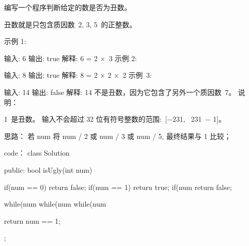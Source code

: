 编写一个程序判断给定的数是否为丑数。

丑数就是只包含质因数 2, 3, 5 的正整数。

示例 1:

输入: 6
输出: true
解释: 6 = 2 × 3
示例 2:

输入: 8
输出: true
解释: 8 = 2 × 2 × 2
示例 3:

输入: 14
输出: false 
解释: 14 不是丑数，因为它包含了另外一个质因数 7。
说明：

1 是丑数。
输入不会超过 32 位有符号整数的范围: [−231,  231 − 1]。




















思路：
若 num %
将 num / 2 或 num / 3 或  num / 5, 最终结果与 1 比较；
























code：
class Solution {
public:
    bool isUgly(int num) {
        if(num == 0) return false;
        if(num == 1) return true;
        if(num %
            return false;
        
        while(num %
        while(num %
        while(num %
        
        return num == 1;
    }
};